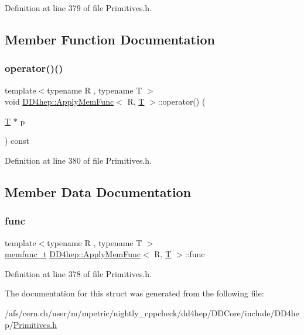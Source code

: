 Definition at line 379 of file Primitives.\+h.



\subsection{Member Function Documentation}
\hypertarget{struct_d_d4hep_1_1_apply_mem_func_a5c23f7d05bb793df22199f8f037cc780}{}\label{struct_d_d4hep_1_1_apply_mem_func_a5c23f7d05bb793df22199f8f037cc780} 
\subsubsection{\texorpdfstring{operator()()}{operator()()}}
{\footnotesize\ttfamily template$<$typename R , typename T $>$ \\
void \hyperlink{struct_d_d4hep_1_1_apply_mem_func}{D\+D4hep\+::\+Apply\+Mem\+Func}$<$ R, \hyperlink{class_t}{T} $>$\+::operator() (\begin{DoxyParamCaption}\item[{\hyperlink{class_t}{T} $\ast$}]{p }\end{DoxyParamCaption}) const\hspace{0.3cm}{\ttfamily [inline]}}



Definition at line 380 of file Primitives.\+h.



\subsection{Member Data Documentation}
\hypertarget{struct_d_d4hep_1_1_apply_mem_func_a9cb93a8dbd712d6daf163e4b46992bf4}{}\label{struct_d_d4hep_1_1_apply_mem_func_a9cb93a8dbd712d6daf163e4b46992bf4} 
\subsubsection{\texorpdfstring{func}{func}}
{\footnotesize\ttfamily template$<$typename R , typename T $>$ \\
\hyperlink{struct_d_d4hep_1_1_apply_mem_func_ab5971c00734a619f31885e8d0fa156f0}{memfunc\+\_\+t} \hyperlink{struct_d_d4hep_1_1_apply_mem_func}{D\+D4hep\+::\+Apply\+Mem\+Func}$<$ R, \hyperlink{class_t}{T} $>$\+::func}



Definition at line 378 of file Primitives.\+h.



The documentation for this struct was generated from the following file\+:\begin{DoxyCompactItemize}
\item 
/afs/cern.\+ch/user/m/mpetric/nightly\+\_\+cppcheck/dd4hep/\+D\+D\+Core/include/\+D\+D4hep/\hyperlink{_primitives_8h}{Primitives.\+h}\end{DoxyCompactItemize}

